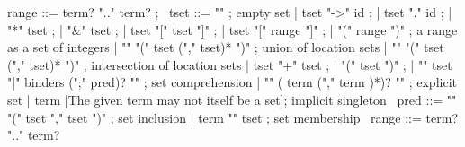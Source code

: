 \begin{syntax}
  range ::= term? ".." term? ;
       \
  tset ::= "\empty" ; empty set
       | tset "->" id ;
       | tset "." id ;
       | "*" tset ;
       | "&" tset ;
       | tset "[" tset "]" ;
       | tset "[" range "]" ;
       | "(" range ")" ; a range as a set of integers
       | "\union" "(" tset ("," tset)* ")" ; union of location sets
       | "\inter" "(" tset ("," tset)* ")" ; intersection of location sets
       | tset "+" tset ;
       | "(" tset ")" ;
       | "{" tset "|" binders (";" pred)? "}" ; set comprehension
       | "{" ( term ("," term )*)? "}" ; explicit set
       | term [The given term may not itself be a set]; implicit singleton
       \
  pred ::= "\subset" "(" tset "," tset ")" ; set inclusion
       | term "\in" tset ; set membership
       \
  range ::= term? ".." term?
\end{syntax}

